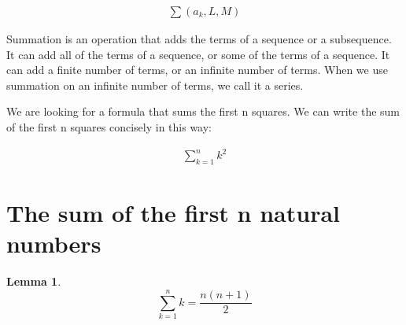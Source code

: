 \documentclass{article}
\newtheorem{lemma}{Lemma}
\begin{document}
\begin{align*}
\sum(a_{k}, L, M) 
\end{align*}
\begin{flushleft}
Summation is an operation that adds the terms of a sequence or a subsequence. It can add all of the terms of a sequence, or some of the terms of a sequence. It can add a finite number of terms, or an infinite number of terms. When we use summation on an infinite number of terms, we call it a series.
\end{flushleft}
\begin{flushleft}
We are looking for a formula that sums the first n squares. We can write the sum of the first n squares concisely in this way:
\end{flushleft}
\begin{align*}
\sum_{k=1}^{n} k^2
\end{align*}
\section{The sum of the first n natural numbers}

\begin{lemma}
\begin{equation*}
\sum_{k=1}^{n} k = \frac{n(n+1)}{2}
\end{equation*}
\end{lemma}
\end{document}
